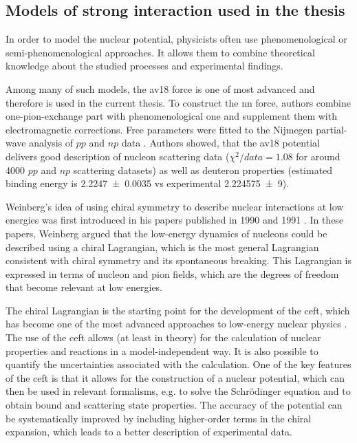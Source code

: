 \subsection*{Models of strong interaction used in the thesis}

In order to model the nuclear potential, physicists often use phenomenological
or semi-phenomenological approaches. It allows them to combine
theoretical knowledge about the studied processes and experimental findings.

Among many of such models, the \gls{av18} \cite{AV18Wiringa} force is one of most
advanced and therefore is used in the current thesis.
To construct the \gls{nn} force, authors combine
one-pion-exchange part
with phenomenological one and supplement them with electromagnetic corrections.
Free parameters were fitted to
the Nijmegen partial-wave analysis of $pp$ and $np$ data \cite{NijmegenPhysRevC.48.792}. 
Authors showed, that the \gls{av18} potential delivers good 
description of nucleon scattering data ($\chi ^2/data = 1.08$ for around \num{4000} $pp$ and $np$ scattering datasets) 
as well as deuteron properties (estimated binding energy is \SI{2.2247(35)}{\mev} vs experimental \SI{ 2.224 575(9)}{\mev}).

Weinberg's idea of using chiral symmetry to describe nuclear interactions at low
energies was first introduced in his papers published in 1990 and 1991 \cite{WEINBERG1990,WEINBERG1991}.
In these papers, Weinberg argued that the low-energy dynamics of nucleons
could be described using a chiral Lagrangian, which is the most general
Lagrangian consistent with chiral symmetry and its spontaneous breaking.
This Lagrangian is expressed in terms of nucleon and pion fields,
which are the degrees of freedom that become relevant at low energies.

The chiral Lagrangian is the starting point for the development of
the \gls{ceft}, which has become one of the
most advanced approaches to low-energy nuclear physics \cite{EpelHam2008}.
The use of the \gls{ceft} allows (at least in theory) for the calculation of nuclear properties
and reactions in a model-independent way.
It is also possible to
quantify the uncertainties associated with the calculation. One of the
key features of the \gls{ceft} is that it allows for the construction of
a nuclear potential, which can then be used in relevant formalisms, e.g. to solve the Schr\"odinger
equation and to obtain bound and scattering state properties. The accuracy of the
potential can be systematically improved by including higher-order
terms in the chiral expansion, which leads to a better description of
experimental data.

